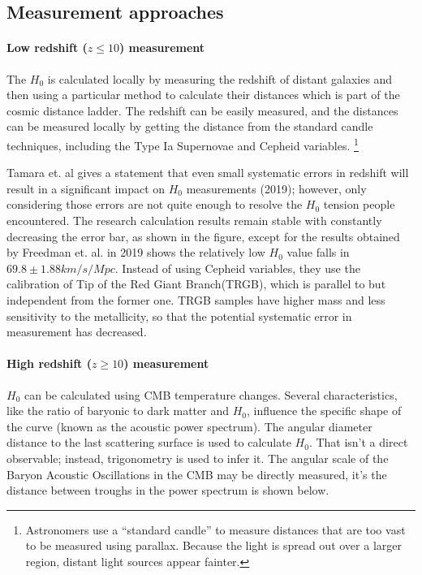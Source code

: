 \subsection{\label{sec:level2}Measurement approaches}

\paragraph{Low redshift ($z \leq 10$) measurement}

The $H_0$ is calculated locally by measuring the redshift of distant galaxies and then using a particular method to calculate their distances which is part of the cosmic distance ladder.
The redshift can be easily measured, and the distances can be measured locally by getting the distance from the standard candle techniques, including the Type Ia Supernovae and Cepheid variables.
 \footnote{Astronomers use a “standard candle” to measure distances that are too vast to be measured using parallax. Because the light is spread out over a larger region, distant light sources appear fainter.}

Tamara et. al gives a statement that even small systematic errors in redshift will result in a significant impact on $H_0$ measurements (2019)\cite{Davis_2019}; however, only considering those errors are not quite enough to resolve the $H_0$ tension people encountered. The research calculation results remain stable with constantly decreasing the error bar, as shown in the figure, except for the results obtained by Freedman et. al. in 2019 shows the relatively low $H_0$ value falls in $69.8 \pm 1.88 km/s/Mpc$\cite{Freedman_2019}. Instead of using Cepheid variables, they use the calibration of Tip of the Red Giant Branch(TRGB), which is parallel to but independent from the former one. TRGB samples have higher mass and less sensitivity to the metallicity, so that the potential systematic error in measurement has decreased.

\paragraph{High redshift ($z \geq 10$) measurement}

$H_0$ can be calculated using CMB temperature changes. Several characteristics, like the ratio of baryonic to dark matter and $H_0$, influence the specific shape of the curve (known as the acoustic power spectrum). The angular diameter distance to the last scattering surface is used to calculate $H_0$. That isn’t a direct observable; instead, trigonometry is used to infer it. The angular scale of the Baryon Acoustic Oscillations in the CMB may be directly measured, it’s the distance between troughs in the power spectrum is shown below.

